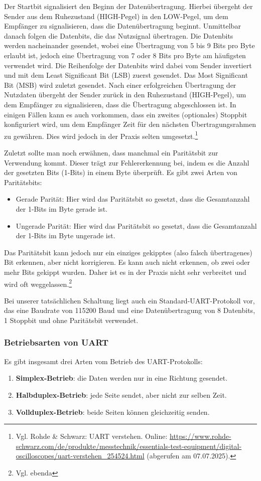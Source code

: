 Der Startbit signalisiert den Beginn der Datenübertragung. Hierbei übergeht der Sender aus dem Ruhezustand (HIGH-Pegel) in den LOW-Pegel, um dem Empfänger zu signalisieren, dass die Datenübertragung beginnt. 
Unmittelbar danach folgen die Datenbits, die das Nutzsignal übertragen. Die Datenbits werden nacheinander gesendet, wobei eine Übertragung von 5 bis 9 Bits pro Byte erlaubt ist, jedoch eine Übertragung von 7 oder 8 Bits pro Byte am häufigsten verwendet wird. Die Reihenfolge der Datenbits wird dabei vom Sender invertiert und mit dem Least Significant Bit (LSB) zuerst gesendet. Das Most Significant Bit (MSB) wird zuletzt gesendet.
Nach einer erfolgreichen Übertragung der Nutzdaten übergeht der Sender zurück in den Ruhezustand (HIGH-Pegel), um dem Empfänger zu signalisieren, dass die Übertragung abgeschlossen ist.
In einigen Fällen kann es auch vorkommen, dass ein zweites (optionales) Stoppbit konfiguriert wird, um dem Empfänger Zeit für den nächsten Übertragungsrahmen zu gewähren. Dies wird jedoch in der Praxis selten umgesetzt.\footnote{Vgl. Rohde \& Schwarz: UART verstehen. Online: \url{https://www.rohde-schwarz.com/de/produkte/messtechnik/essentials-test-equipment/digital-oscilloscopes/uart-verstehen_254524.html} (abgerufen am 07.07.2025).}

Zuletzt sollte man noch erwähnen, dass manchmal ein Paritätsbit zur Verwendung kommt. Dieser trägt zur Fehlererkennung bei, indem es die Anzahl der gesetzten Bits (1-Bits) in einem Byte überprüft. Es gibt zwei Arten von Paritätsbits: 
\begin{itemize}
    \item Gerade Parität: Hier wird das Paritätsbit so gesetzt, dass die Gesamtanzahl der 1-Bits im Byte gerade ist.
    \item Ungerade Parität: Hier wird das Paritätsbit so gesetzt, dass die Gesamtanzahl der 1-Bits im Byte ungerade ist.
\end{itemize}

Das Paritätsbit kann jedoch nur ein einziges gekipptes (also falsch übertragenes) Bit erkennen, aber nicht korrigieren. Es kann auch nicht erkennen, ob zwei oder mehr Bits gekippt wurden. Daher ist es in der Praxis nicht sehr verbreitet und wird oft weggelassen.\footnote{Vgl. ebenda}

Bei unserer tatsächlichen Schaltung liegt auch ein Standard-UART-Protokoll vor, das eine Baudrate von 115200 Baud und eine Datenübertragung von 8 Datenbits, 1 Stoppbit und ohne Paritätsbit verwendet.

\subsubsection{Betriebsarten von UART}
Es gibt insgesamt drei Arten vom Betrieb des UART-Protokolls:
\begin{enumerate}
    \item \textbf{Simplex-Betrieb}: die Daten werden nur in eine Richtung gesendet.
    \item \textbf{Halbduplex-Betrieb}: jede Seite sendet, aber nicht zur selben Zeit.
    \item \textbf{Vollduplex-Betrieb}: beide Seiten können gleichzeitig senden.
\end{enumerate}

